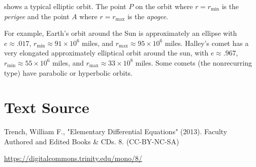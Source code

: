 \documentclass{ximera}
\begin{document}

 shows a typical elliptic orbit.
The point $P$ on the orbit where $r=r_{\min}$ is the  \textit{perigee} and  the point $A$ where $r=r_{\max}$ is the \textit{apogee}.

For example, Earth's orbit around the Sun is approximately an ellipse
with $e\approx.017$, $r_{\min}\approx91\times 10^6$ miles, and
$r_{\max}\approx 95\times 10^6$ miles. Halley's comet has a very
elongated approximately elliptical orbit around the sun, with
$e\approx.967$, $r_{\min}\approx55\times10^6$ miles, and
$r_{\max}\approx33\times10^8$ miles. Some comets (the nonrecurring
type) have parabolic or hyperbolic orbits.


\section*{Text Source}
Trench, William F., "Elementary Differential Equations" (2013). Faculty Authored and Edited Books \& CDs. 8. (CC-BY-NC-SA)

\href{https://digitalcommons.trinity.edu/mono/8/}{https://digitalcommons.trinity.edu/mono/8/}
\end{document}
